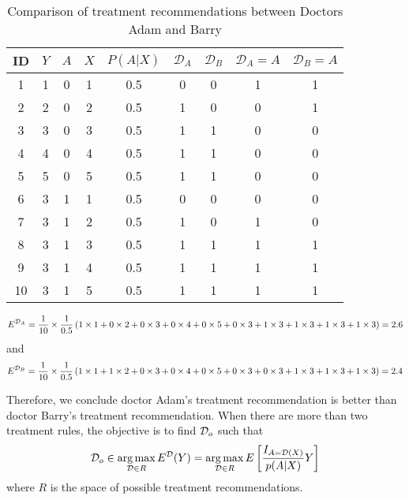 \begin{table}[htbp]
\centering
\caption{Comparison of treatment recommendations between Doctors Adam and Barry}
\begin{tabular}{c|ccc|ccccc}
\hline \hline
ID & $Y$ & $A$ & $X$ & $P\left( {A|X} \right)$ &
$\mathcal{D}_A$ & $\mathcal{D}_B$ & $\mathcal{D}_A = A$ & $\mathcal{D}_B = A$
\\
\hline
1  & 1 & 0 & 1 & 0.5  & 0  & 0  & 1   & 1   \\
2  & 2 & 0 & 2 & 0.5  & 1  & 0  & 0   & 1   \\
3  & 3 & 0 & 3 & 0.5  & 1  & 1  & 0   & 0   \\
4  & 4 & 0 & 4 & 0.5  & 1  & 1  & 0   & 0   \\
5  & 5 & 0 & 5 & 0.5  & 1  & 1  & 0   & 0   \\
6  & 3 & 1 & 1 & 0.5  & 0  & 0  & 0   & 0   \\
7  & 3 & 1 & 2 & 0.5  & 1  & 0  & 1   & 0   \\
8  & 3 & 1 & 3 & 0.5  & 1  & 1  & 1   & 1   \\
9  & 3 & 1 & 4 & 0.5  & 1  & 1  & 1   & 1   \\
10 & 3 & 1 & 5 & 0.5  & 1  & 1  & 1   & 1   \\
\hline \hline
\end{tabular}
\end{table}

\[
E^{{\cal D}_A} = \frac{1}{10}\times \frac{1}{0.5}
\left (
1\times 1 + 0 \times 2 + 0 \times 3 + 0 \times 4 + 0 \times 5 +
0\times 3 + 1 \times 3 + 1 \times 3 + 1 \times 3 + 1 \times 3
\right) = 2.6
\]
and
\[
E^{{\cal D}_B} = \frac{1}{10}\times \frac{1}{0.5}
\left (
1\times 1 + 1 \times 2 + 0 \times 3 + 0 \times 4 + 0 \times 5 +
0\times 3 + 0 \times 3 + 1 \times 3 + 1 \times 3 + 1 \times 3
\right) = 2.4
\]

Therefore, we conclude doctor Adam's treatment recommendation is better than
doctor Barry's treatment recommendation. When there are more than two treatment
rules, the objective is to find  ${\cal D}_o$ such that
\[
  {\cal D}_o \in \mathop {\arg \max} \limits_{{\cal D} \in R} E^{\cal D}(Y) =
  \mathop {\arg \max} \limits_{{\cal D} \in R}
  E\left [ \frac{I_{A={\cal D}(X)}}{p(A|X)} Y \right ]
\]
where $R$ is the space of possible treatment recommendations. 
